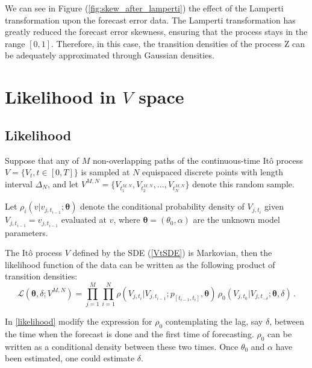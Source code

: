 \documentclass[11pt]{article}
\theoremstyle{definition}
\begin{document}
{\color{red}We can see in Figure (\ref{fig:skew_after_lamperti}) the effect of the Lamperti transformation upon the forecast error data. 
The Lamperti transformation has greatly reduced the forecast error skewness, ensuring that the process stays in the range $[0,1]$. Therefore, in this case, the transition densities of the process Z can be adequately approximated through Gaussian densities.}

\section{Likelihood in $V$ space} \label{Section_4}

\subsection{Likelihood}

Suppose that any of $M$ non-overlapping paths of the continuous-time It\^{o} process $V = \{ V_t, t  \in [0,T] \}$ is sampled at $N$ equispaced discrete points with length interval $\Delta_N$, and let $ V^{M,N}=\{ V_{t_1^{M,N}} , V_{t_2^{M,N}} ,\ldots , V_{t_N^{M,N}} \}$ denote this random sample. 

Let $\rho_i(v \vert v_{j, t_{i-1}} ; \bm{\theta})$ denote the conditional probability density of $V_{j, t_i}$ given $V_{j, t_{i-1}} = v_{j, t_{i-1}}$ evaluated at $v$, where $\bm{\theta} = (\theta_0, \alpha)$ are the unknown model parameters.

The It\^{o} process $V$ defined by the SDE (\ref{VtSDE}) is Markovian, then the likelihood function of the data can be written as the following product of transition densities:  
\begin{equation}
\mathcal{L}(\bm{\theta},\delta; V^{M,N}) = \prod\limits_{j=1}^M \prod\limits_{i=1}^N \rho ( {V_{j, t_i}| V_{j, t_{i-1}}} ; p_{[t_{i-1}, t_{i}]},  \bm{\theta} )  \, \rho_0 (V_{j, t_0}|V_{j, t_{-\delta}};\bm{\theta},\delta) \,.
\label{likelihood}
\end{equation}

 {\color{red} In \ref{likelihood} modify the expression for $\rho_0$ contemplating the lag, say $\delta$, between the time when the forecast is done and the first time of forecasting. $\rho_0$ can be written as a conditional density between these two times. Once $\theta_0$ and $\alpha$ have been estimated, one could estimate $\delta$.}
\end{document}
